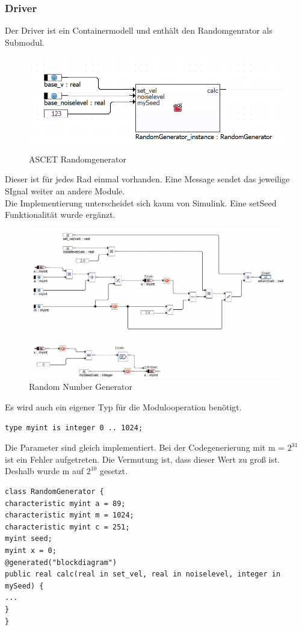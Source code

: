 \subsubsection{Driver}
Der Driver ist ein Containermodell und enthält den Randomgenrator als Submodul.
\begin{figure}[H]
	\centering
	\includegraphics[width=0.7\linewidth]{../Graphiken/ASCETRandomgen.png}
	\caption{ASCET Randomgenerator}
	\label{fig:ASCETRandom}
\end{figure}
Dieser ist für jedes Rad einmal vorhanden. Eine Message sendet das jeweilige SIgnal weiter an andere Module.\\
Die Implementierung unterscheidet sich kaum von Simulink. Eine setSeed Funktionalität wurde ergänzt.
\begin{figure}[H]
	\centering
	\includegraphics[width=1\linewidth]{../Graphiken/RandomGenerator.png}
	\caption{Random Number Generator}
	\label{fig:RandomGenerator}
\end{figure}
Es wird auch ein eigener Typ für die Modulooperation benötigt.
\begin{lstlisting}
type myint is integer 0 .. 1024;
\end{lstlisting}
Die Parameter sind gleich implementiert. Bei der Codegenerierung mit m = $2^{31}$ ist ein Fehler aufgetreten. Die Vermutung ist, dass dieser Wert zu groß ist. Deshalb wurde m auf $2^{10}$ gesetzt.
\begin{lstlisting}
class RandomGenerator {
characteristic myint a = 89;
characteristic myint m = 1024;
characteristic myint c = 251;
myint seed;
myint x = 0;
@generated("blockdiagram")
public real calc(real in set_vel, real in noiselevel, integer in mySeed) {
...
}
}
\end{lstlisting}

